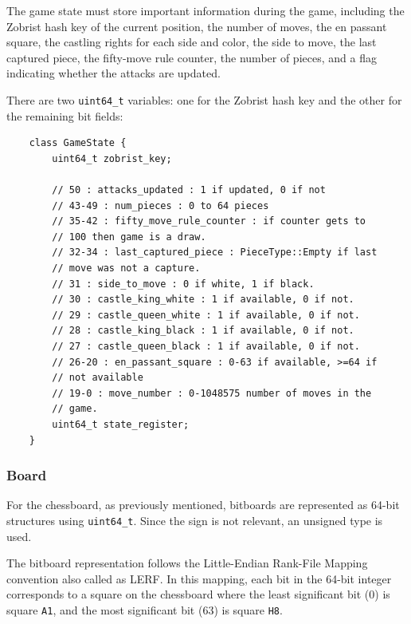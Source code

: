 The game state must store important information during the game, including the Zobrist hash key of the current position, the number of moves, the en passant square, the castling rights for each side and color, the side to move, the last captured piece, the fifty-move rule counter, the number of pieces, and a flag indicating whether the attacks are updated.

\vspace{1em}

\noindent There are two \texttt{uint64\_t} variables: one for the Zobrist hash key and the other for the remaining bit fields:

\begin{lstlisting}
    class GameState {
        uint64_t zobrist_key;

        // 50 : attacks_updated : 1 if updated, 0 if not
        // 43-49 : num_pieces : 0 to 64 pieces
        // 35-42 : fifty_move_rule_counter : if counter gets to 
        // 100 then game is a draw.
        // 32-34 : last_captured_piece : PieceType::Empty if last
        // move was not a capture.
        // 31 : side_to_move : 0 if white, 1 if black.
        // 30 : castle_king_white : 1 if available, 0 if not.
        // 29 : castle_queen_white : 1 if available, 0 if not.
        // 28 : castle_king_black : 1 if available, 0 if not.
        // 27 : castle_queen_black : 1 if available, 0 if not.
        // 26-20 : en_passant_square : 0-63 if available, >=64 if
        // not available
        // 19-0 : move_number : 0-1048575 number of moves in the 
        // game.
        uint64_t state_register;
    }
\end{lstlisting}

\subsubsection{Board}

For the chessboard, as previously mentioned, bitboards are represented as 64-bit structures using \texttt{uint64\_t}. Since the sign is not relevant, an unsigned type is used.

\vspace{1em}

\noindent The bitboard representation follows the Little-Endian Rank-File Mapping convention also called as LERF. In this mapping, each bit in the 64-bit integer corresponds to a square on the chessboard where the least significant bit (0) is square \texttt{A1}, and the most significant bit (63) is square \texttt{H8}.


